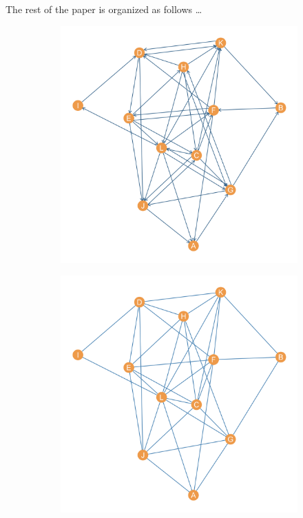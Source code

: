 \documentclass[a4paper,fleqn]{cas-sc}
\begin{document}
The rest of the paper is organized as follows \ldots

\begin{figure}[h!t!]
    \captionsetup[subfigure]{font=footnotesize,labelfont=footnotesize}
     \centering
     \begin{subfigure}[b]{0.45\textwidth}
        \includegraphics[width=1.0\textwidth]{Plots/directed.png}
        \caption{}
        \label{fig:directed}
    \end{subfigure} 
     \begin{subfigure}[b]{0.45\textwidth}
        \includegraphics[width=1.0\textwidth]{Plots/undirected.png}
        \caption{}
        \label{fig:undirected}
    \end{subfigure}
\end{figure}
\end{document}
